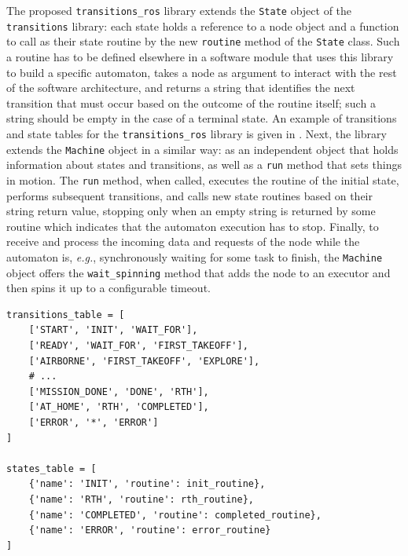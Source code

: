 The proposed \texttt{transitions\_ros} library \cite{masocco_transitions_ros_2022} extends the \texttt{State} object of the \texttt{transitions} library: each state holds a reference to a \ROS node object and a function to call as their state routine by the new \texttt{routine} method of the \texttt{State} class. Such a routine has to be defined elsewhere in a software module that uses this library to build a specific automaton, takes a \ROS node as argument to interact with the rest of the software architecture, and returns a string that identifies the next transition that must occur based on the outcome of the routine itself; such a string should be empty in the case of a terminal state. An example of transitions and state tables for the \texttt{transitions\_ros} library is given in . Next, the library extends the \texttt{Machine} object in a similar way: as an independent object that holds information about states and transitions, as well as a \texttt{run} method that sets things in motion. The \texttt{run} method, when called, executes the routine of the initial state, performs subsequent transitions, and calls new state routines based on their string return value, stopping only when an empty string is returned by some routine which indicates that the automaton execution has to stop. Finally, to receive and process the incoming data and requests of the node while the automaton is, \emph{e.g.}, synchronously waiting for some task to finish, the \texttt{Machine} object offers the \texttt{wait\_spinning} method that adds the node to an executor and then spins it up to a configurable timeout.
\begin{center}
\begin{minipage}[t]{.9\textwidth}
\begin{lstlisting}[caption={Example of transitions and state tables in the \texttt{transitions\_ros} library \cite{masocco_transitions_ros_2022}.}, label={lst:transitions}]
transitions_table = [
    ['START', 'INIT', 'WAIT_FOR'],
    ['READY', 'WAIT_FOR', 'FIRST_TAKEOFF'],
    ['AIRBORNE', 'FIRST_TAKEOFF', 'EXPLORE'],
    # ...
    ['MISSION_DONE', 'DONE', 'RTH'],
    ['AT_HOME', 'RTH', 'COMPLETED'],
    ['ERROR', '*', 'ERROR']
]

states_table = [
    {'name': 'INIT', 'routine': init_routine},
    {'name': 'RTH', 'routine': rth_routine},
    {'name': 'COMPLETED', 'routine': completed_routine},
    {'name': 'ERROR', 'routine': error_routine}
]
\end{lstlisting}
\end{minipage}
\end{center}

